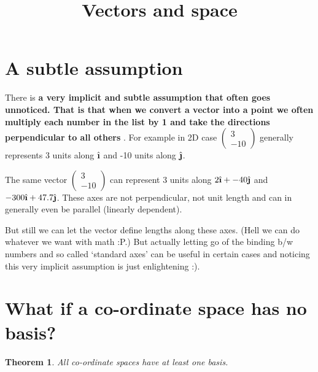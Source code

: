 \documentclass[12pt]{article}
\title{Vectors and space}
\author{}
\newtheorem{theorem}{Theorem}
\newcommand{\comment}[1]{}
\newcommand{\ihat}{\hat{\textbf{\i}}}
\newcommand{\jhat}{\hat{\textbf{\j}}}
\begin{document}
\maketitle

\section{A subtle assumption}
There is \textbf{a very implicit and subtle assumption that often goes unnoticed. That is that when we convert a vector into a point we often multiply each number in the list by 1 and take the directions perpendicular to all others} . For example in 2D case $ \comment{Column-Vector: 3, -10} \begin{pmatrix} 3 \\  -10 \end{pmatrix} $ generally represents 3 units along $ \ihat $ and -10 units along $ \jhat $.

The same vector $ \comment{Column-Vector: 3, -10} \begin{pmatrix} 3 \\  -10 \end{pmatrix} $ can represent 3 units along $ 2\ihat + -40\jhat $ and $ -300\ihat + 47.7\jhat $. These axes are not perpendicular, not unit length and can in generally even be parallel (linearly dependent).

But still we can let the vector define lengths along these axes. (Hell we can do whatever we want with math :P.) But actually letting go of the binding b/w numbers and so called `standard axes' can be useful in certain cases and noticing this very implicit assumption is just enlightening :).

\section{What if a co-ordinate space has no basis?}
\begin{theorem}
All co-ordinate spaces have at least one basis.
\end{theorem}
\end{document}
